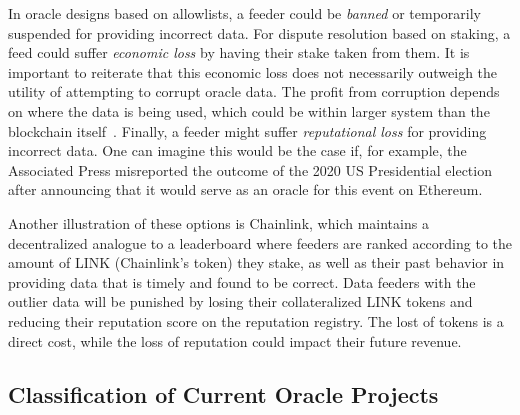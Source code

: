 In oracle designs based on allowlists, a feeder could be \textit{banned} or temporarily suspended for providing incorrect data. For dispute resolution based on staking, a feed could suffer \textit{economic loss} by having their stake taken from them. It is important to reiterate that this economic loss does not necessarily outweigh the utility of attempting to corrupt oracle data. The profit from corruption depends on where the data is being used, which could be within larger system than the blockchain itself~\cite{FoBo19}. Finally, a feeder might suffer \textit{reputational loss} for providing incorrect data. One can imagine this would be the case if, for example, the Associated Press misreported the outcome of the 2020 US Presidential election after announcing that it would serve as an oracle for this event on Ethereum.

Another illustration of these options is Chainlink, which maintains a decentralized analogue to a leaderboard where feeders are ranked according to the amount of LINK (Chainlink's token) they stake, as well as their past behavior in providing data that is timely and found to be correct. Data feeders with the outlier data will be punished by losing their collateralized LINK tokens and reducing their reputation score on the reputation registry. The lost of tokens is a direct cost, while the loss of reputation could impact their future revenue. 




\subsection{Classification of Current Oracle Projects} \label{oracle_categories}




